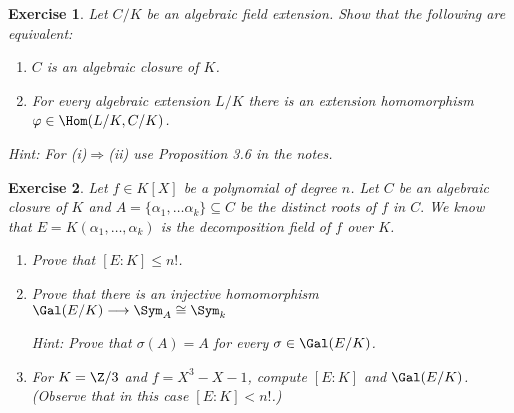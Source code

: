 \documentclass[a4paper,10pt,reqno]{amsart}
\newtheorem{ex}{Exercise}[section]
\newenvironment{sol}
  {\renewcommand\qedsymbol{$\blacksquare$}\begin{proof}[Solution]}
  {\end{proof}}
\begin{document}

\begin{ex}
Let $C/K$ be an algebraic field extension.
Show that the following are equivalent:
\begin{enumerate}[label=(\roman*)]
    \item $C$ is an algebraic closure of $K$.
    \item For every algebraic extension $L/K$ there is an extension homomorphism $\varphi\in \Hom(L/K,C/K)$.
\end{enumerate}  
\noindent \textit{Hint:} For (i)$\Rightarrow$(ii) use Proposition 3.6 in the notes.
\end{ex}





\begin{ex}
    Let $f\in K[X]$ be a polynomial of degree $n$.
    Let $C$ be an algebraic closure of $K$ and $A=\{\alpha_1,\dots\alpha_k\}\subseteq C$ be the distinct roots of $f$ in $C.$
    We know that $E=K(\alpha_1,\dots,\alpha_k)$ is the decomposition field of $f$ over $K$.
    \begin{enumerate}[label=(\roman*)]
    \item Prove that $[E:K]\leq n! $.
    \item Prove that there is an injective homomorphism $\Gal(E/K)\longrightarrow \Sym_{A}\cong \Sym_k$ 
    
    \noindent\textit{Hint: } Prove that $\sigma(A)=A$ for every $\sigma \in \Gal(E/K)$.
    \item For $K=\Z/3$ and $f=X^3-X-1$, compute $[E:K]$ and $\Gal(E/K)$.
    (Observe that in this case $[E:K]<n!$.)
    \end{enumerate}
\end{ex}
\end{document}
